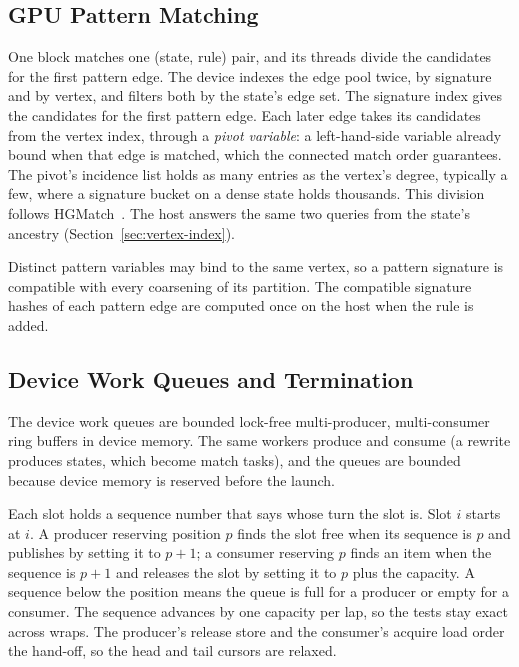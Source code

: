 \documentclass[9pt,twocolumn,a4paper]{extarticle}
\begin{document}
\subsection{GPU Pattern Matching}

One block matches one (state, rule) pair, and its threads divide the candidates for the first
pattern edge. The device indexes the edge pool twice, by signature and by vertex, and filters both
by the state's edge set. The signature index gives the candidates for the first pattern edge. Each
later edge takes its candidates from the vertex index, through a \emph{pivot variable}: a
left-hand-side variable already bound when that edge is matched, which the connected match order
guarantees. The pivot's incidence list holds as many entries as the vertex's degree, typically a
few, where a signature bucket on a dense state holds thousands. This division follows
HGMatch~\cite{yang2023hgmatch}. The host answers the same two queries from the state's ancestry
(Section~\ref{sec:vertex-index}).

Distinct pattern variables may bind to the same vertex, so a pattern signature is compatible with
every coarsening of its partition. The compatible signature hashes of each pattern edge are
computed once on the host when the rule is added.

\subsection{Device Work Queues and Termination}
\label{sec:gpu-queues}

The device work queues are bounded lock-free multi-producer, multi-consumer ring buffers in device
memory. The same workers produce and consume (a rewrite produces states, which become match
tasks), and the queues are bounded because device memory is reserved before the launch.

Each slot holds a sequence number that says whose turn the slot is. Slot $i$ starts at $i$. A
producer reserving position $p$ finds the slot free when its sequence is $p$ and publishes by
setting it to $p+1$; a consumer reserving $p$ finds an item when the sequence is $p+1$ and releases
the slot by setting it to $p$ plus the capacity. A sequence below the position means the queue is
full for a producer or empty for a consumer. The sequence advances by one capacity per lap, so the
tests stay exact across wraps. The producer's release store and the consumer's acquire load order
the hand-off, so the head and tail cursors are relaxed.
\end{document}
